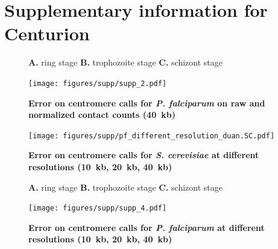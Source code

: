 \chapter{Supplementary information for Centurion}

\graphicspath{{8_centurion_supplementaries/}}


\begin{figure}[ht!]
\caption{\textbf{Error on centromere calls for \textit{P. falciparum} on raw
and normalized contact counts (40~kb)}}{
\textbf{A.} ring stage \textbf{B.}
trophozoite stage \textbf{C.} schizont stage}
\begin{center}
\texttt{[image: figures/supp/supp\_2.pdf]}
\end{center}
\label{suppfig:raw_vs_normed_pf}
\end{figure}

\clearpage

\begin{figure}[ht!]
\caption{\textbf{Error on centromere calls for \textit{S. cerevisiae}
at different resolutions (10~kb, 20~kb, 40~kb)}}
\begin{center}
\texttt{[image: figures/supp/pf\_different\_resolution\_duan.SC.pdf]}
\end{center}
\label{suppfig:error_diff_res_sc}
\end{figure}


\begin{figure}[ht!]
\caption{\textbf{Error on centromere calls for \textit{P. falciparum}
at different resolutions (10~kb, 20~kb, 40~kb)}}
{\textbf{A.} ring stage \textbf{B.} trophozoite stage \textbf{C.} schizont stage}
\begin{center}
\texttt{[image: figures/supp/supp\_4.pdf]}
\end{center}
\label{suppfig:error_diff_res_pf}
\end{figure}

\clearpage

